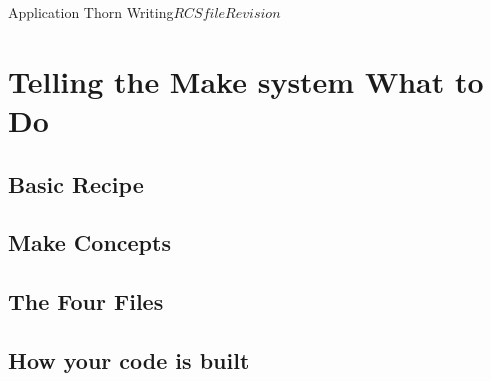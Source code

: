 \begin{cactuspart}{Application Thorn Writing}{$RCSfile$}{$Revision$}

\chapter{Telling the Make system What to Do}


\section{Basic Recipe}


\section{Make Concepts}


\section{The Four Files}


\section{How your code is built}


\end{cactuspart}
